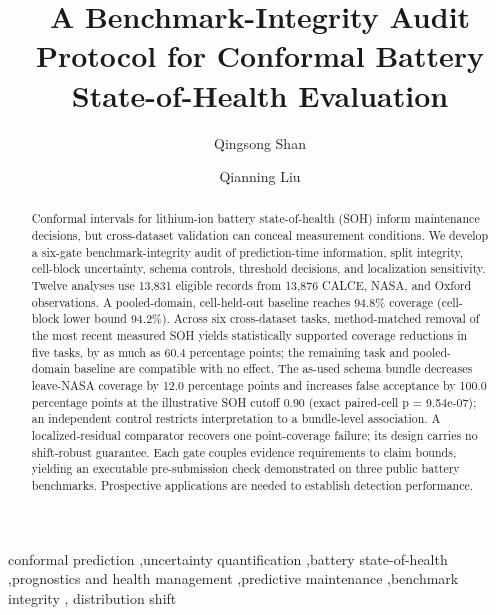 \documentclass[
  number,
  preprint]{elsarticle}
\begin{document}
\begin{frontmatter}
\title{A Benchmark-Integrity Audit Protocol for Conformal Battery
State-of-Health Evaluation}
\author[1]{Qingsong Shan%
%
}
\author[1]{Qianning Liu%
%
}


        
\begin{abstract}
Conformal intervals for lithium-ion battery state-of-health (SOH) inform
maintenance decisions, but cross-dataset validation can conceal
measurement conditions. We develop a six-gate benchmark-integrity audit
of prediction-time information, split integrity, cell-block uncertainty,
schema controls, threshold decisions, and localization sensitivity.
Twelve analyses use 13,831 eligible records from 13,876 CALCE, NASA, and
Oxford observations. A pooled-domain, cell-held-out baseline reaches
94.8\% coverage (cell-block lower bound 94.2\%). Across six
cross-dataset tasks, method-matched removal of the most recent measured
SOH yields statistically supported coverage reductions in five tasks, by
as much as 60.4 percentage points; the remaining task and pooled-domain
baseline are compatible with no effect. The as-used schema bundle
decreases leave-NASA coverage by 12.0 percentage points and increases
false acceptance by 100.0 percentage points at the illustrative SOH
cutoff 0.90 (exact paired-cell p = 9.54e-07); an independent control
restricts interpretation to a bundle-level association. A
localized-residual comparator recovers one point-coverage failure; its
design carries no shift-robust guarantee. Each gate couples evidence
requirements to claim bounds, yielding an executable pre-submission
check demonstrated on three public battery benchmarks. Prospective
applications are needed to establish detection performance.
\end{abstract}





\begin{keyword}
    conformal prediction \sep uncertainty quantification \sep battery
state-of-health \sep prognostics and health management \sep predictive
maintenance \sep benchmark integrity \sep 
    distribution shift
\end{keyword}
\end{frontmatter}
    
\end{document}
